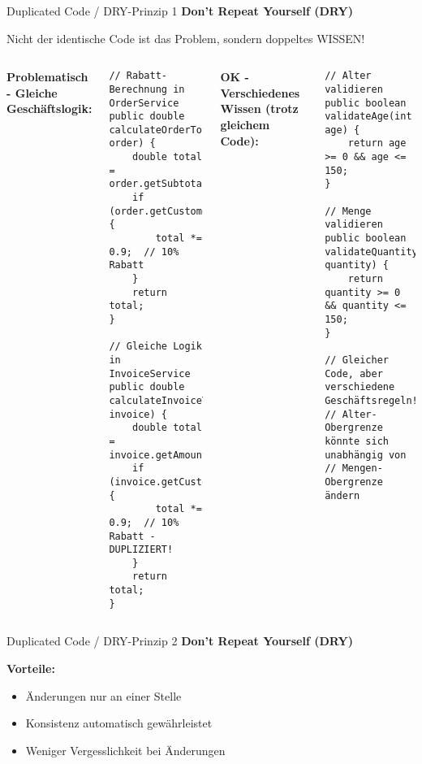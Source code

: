 \begin{frame}[fragile]{Duplicated Code / DRY-Prinzip 1}
  \textbf{Don't Repeat Yourself (DRY)}

  \begin{alertblock}{Nicht der identische Code ist das Problem, sondern doppeltes WISSEN!}
  \end{alertblock}

  \begin{columns}[T]
    \textbf{Problematisch - Gleiche Geschäftslogik:}
    \begin{lstlisting}[style=java, basicstyle=\tiny\ttfamily]
// Rabatt-Berechnung in OrderService
public double calculateOrderTotal(Order order) {
    double total = order.getSubtotal();
    if (order.getCustomer().isPremium()) {
        total *= 0.9;  // 10% Rabatt
    }
    return total;
}

// Gleiche Logik in InvoiceService
public double calculateInvoiceTotal(Invoice invoice) {
    double total = invoice.getAmount();
    if (invoice.getCustomer().isPremium()) {
        total *= 0.9;  // 10% Rabatt - DUPLIZIERT!
    }
    return total;
}
    \end{lstlisting}

    \textbf{OK - Verschiedenes Wissen (trotz gleichem Code):}
    \begin{lstlisting}[style=java, basicstyle=\tiny\ttfamily]
// Alter validieren
public boolean validateAge(int age) {
    return age >= 0 && age <= 150;
}

// Menge validieren
public boolean validateQuantity(int quantity) {
    return quantity >= 0 && quantity <= 150;
}

// Gleicher Code, aber verschiedene Geschäftsregeln!
// Alter-Obergrenze könnte sich unabhängig von
// Mengen-Obergrenze ändern
    \end{lstlisting}
  \end{columns}
\end{frame}

\begin{frame}[fragile]{Duplicated Code / DRY-Prinzip 2}
  \textbf{Don't Repeat Yourself (DRY)}

  \textbf{Vorteile:}
  \begin{itemize}
    \item Änderungen nur an einer Stelle
    \item Konsistenz automatisch gewährleistet
    \item Weniger Vergesslichkeit bei Änderungen
  \end{itemize}
\end{frame}
